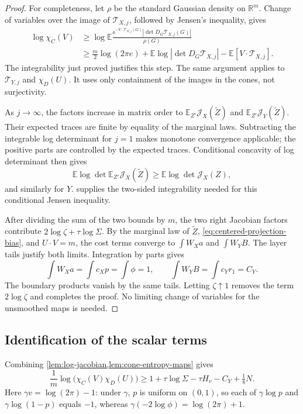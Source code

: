 \begin{proof}
For completeness, let $\rho$ be the standard Gaussian density on $\mathbb{R}^m$. Change of variables over the image of $\mathcal{T}_{X,j}$, followed by Jensen's inequality, gives
\[
\begin{aligned}
\log\chi_C(V)
&\ge\log\mathbb{E}\frac{\ee^{-V\cdot\mathcal{T}_{X,j}(G)}
 |\det D_G\mathcal{T}_{X,j}(G)|}{\rho(G)}\\
&\ge\tfrac m2\log(2\pi e)
+\mathbb{E}\log|\det D_G\mathcal{T}_{X,j}|-\mathbb{E}[V\cdot\mathcal{T}_{X,j}].
\end{aligned}
\]
The integrability just proved justifies this step. The same argument applies to $\mathcal{T}_{Y,j}$ and $\chi_D(U)$. It uses only containment of the images in the cones, not surjectivity.

As $j\to\infty$, the factors increase in matrix order to $\mathbb{E}_{Z'}\mathcal{J}_X(\widetilde Z)$ and $\mathbb{E}_{Z'}\mathcal{J}_Y(\widetilde Z)$. Their expected traces are finite by equality of the marginal laws. Subtracting the integrable log determinant for $j=1$ makes monotone convergence applicable; the positive parts are controlled by the expected traces. Conditional concavity of log determinant \cite{BV04} then gives
\[
\mathbb{E}\log\det\mathbb{E}_{Z'}\mathcal{J}_X(\widetilde Z)
\ge\mathbb{E}\log\det\mathcal{J}_X(Z),
\]
and similarly for $Y$.  supplies the two-sided integrability needed for this conditional Jensen inequality.

After dividing the sum of the two bounds by $m$, the two right Jacobian factors contribute $2\log\zeta+\tau\log\Sigma$. By the marginal law of $\widetilde Z$, \eqref{eq:centered-projection-bias}, and $U\cdot V=m$, the cost terms converge to $\int W_Xa$ and $\int W_YB$. The layer tails justify both limits. Integration by parts gives
\[
\int W_Xa=\int c_Xp=\int\phi=1,\qquad
\int W_YB=\int c_Yr_1=C_Y.
\]
The boundary products vanish by the same tails. Letting $\zeta\uparrow1$ removes the term $2\log\zeta$ and completes the proof. No limiting change of variables for the unsmoothed maps is needed.
\end{proof}

\subsection{Identification of the scalar terms}
Combining \cref{lem:log-jacobian,lem:cone-entropy-maps} gives
\[
\frac1m\log\bigl(\chi_C(V)\chi_D(U)\bigr)
\ge1+\tau\log\Sigma-\tau H_v-C_Y+\tfrac18N.
\]
Here $\gamma v=\log(2\pi)-1$: under $\gamma$, $p$ is uniform on $(0,1)$, so each of $\gamma\log p$ and $\gamma\log(1-p)$ equals $-1$, whereas $\gamma(-2\log\phi)=\log(2\pi)+1$.

